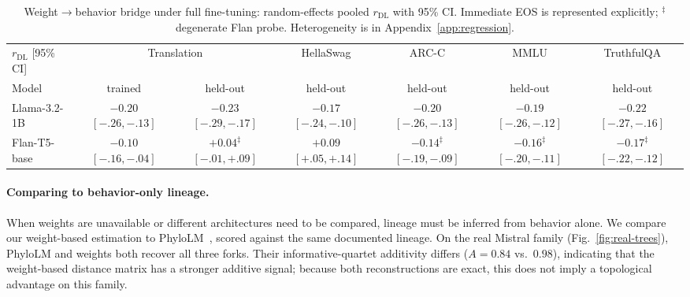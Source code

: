 \documentclass{article}
\theoremstyle{definition}
\theoremstyle{plain}
\begin{document}
\begin{table}[t]
\caption{Weight$\to$behavior bridge under full fine-tuning: random-effects pooled
  $r_{\mathrm{DL}}$ with 95\% CI. Immediate EOS is represented explicitly; $^\ddagger$degenerate
  Flan probe. Heterogeneity is in Appendix~\ref{app:regression}.}
\label{tab:behavior_holdout}
\centering
\small
\setlength{\tabcolsep}{5pt}
\begin{tabular}{lcccccc}
\toprule
$r_{\mathrm{DL}}$ [95\% CI] & \multicolumn{2}{c}{Translation} & HellaSwag & ARC-C & MMLU & TruthfulQA \\
\cmidrule(lr){2-3}
Model & trained & held-out & held-out & held-out & held-out & held-out \\
\midrule
Llama-3.2-1B & \shortstack{$-0.20$\\{\scriptsize$[-.26,-.13]$}} & \shortstack{$-0.23$\\{\scriptsize$[-.29,-.17]$}} & \shortstack{$-0.17$\\{\scriptsize$[-.24,-.10]$}} & \shortstack{$-0.20$\\{\scriptsize$[-.26,-.13]$}} & \shortstack{$-0.19$\\{\scriptsize$[-.26,-.12]$}} & \shortstack{$-0.22$\\{\scriptsize$[-.27,-.16]$}} \\
\addlinespace
Flan-T5-base & \shortstack{$-0.10$\\{\scriptsize$[-.16,-.04]$}} & \shortstack{$+0.04^{\ddagger}$\\{\scriptsize$[-.01,+.09]$}} & \shortstack{$+0.09$\\{\scriptsize$[+.05,+.14]$}} & \shortstack{$-0.14^{\ddagger}$\\{\scriptsize$[-.19,-.09]$}} & \shortstack{$-0.16^{\ddagger}$\\{\scriptsize$[-.20,-.11]$}} & \shortstack{$-0.17^{\ddagger}$\\{\scriptsize$[-.22,-.12]$}} \\
\bottomrule
\end{tabular}
\end{table}


\paragraph{Comparing to behavior-only lineage.}
\label{sec:results:blackbox}

When weights are unavailable or different architectures need to be compared, lineage must be inferred from behavior alone. We compare our weight-based
estimation to PhyloLM~\citep{yax2025phylolm}, scored against the
same documented lineage. On the real Mistral family (Fig.~\ref{fig:real-trees}), PhyloLM and weights
both recover all three forks. Their informative-quartet additivity differs ($A=0.84$ vs.\ $0.98$), indicating that the weight-based distance matrix has a stronger additive signal; because both reconstructions are exact, this does not imply a topological advantage on this family.
\end{document}
